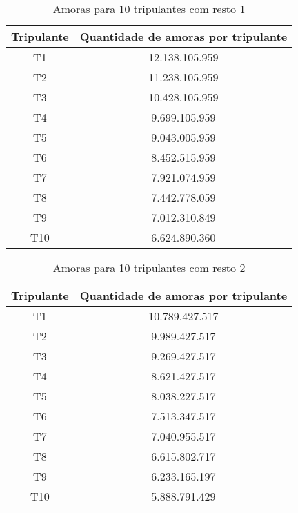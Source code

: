 \documentclass[12pt]{article}
\begin{document}
\begin{table}[H]

\centering

\begin{tabular}{|c|c|}

\hline
Tripulante & Quantidade de amoras por tripulante \\
\hline
T1 & 12.138.105.959 \\
\hline
T2 & 11.238.105.959 \\
\hline
T3 & 10.428.105.959 \\
\hline
T4 & 9.699.105.959 \\
\hline
T5 & 9.043.005.959 \\
\hline
T6 & 8.452.515.959 \\
\hline
T7 & 7.921.074.959 \\
\hline
T8 & 7.442.778.059 \\
\hline
T9 & 7.012.310.849 \\
\hline
T10 & 6.624.890.360 \\
\hline

\end{tabular}
\label{Tabela17}
\caption{Amoras para 10 tripulantes com resto 1}

\end{table}

\begin{table}[H]

\centering

\begin{tabular}{|c|c|}

\hline
Tripulante & Quantidade de amoras por tripulante \\
\hline
T1 & 10.789.427.517 \\
\hline
T2 & 9.989.427.517 \\
\hline
T3 & 9.269.427.517 \\
\hline
T4 & 8.621.427.517 \\
\hline
T5 & 8.038.227.517 \\
\hline
T6 & 7.513.347.517 \\
\hline
T7 & 7.040.955.517 \\
\hline
T8 & 6.615.802.717 \\
\hline
T9 & 6.233.165.197 \\
\hline
T10 & 5.888.791.429 \\
\hline

\end{tabular}
\label{Tabela18}
\caption{Amoras para 10 tripulantes com resto 2}

\end{table}
\end{document}
